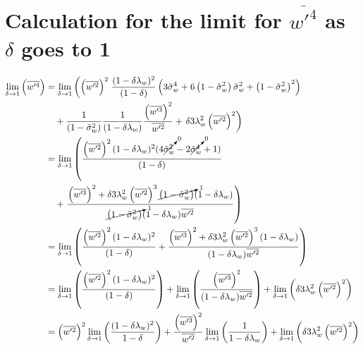 \section{Calculation for the limit for \texorpdfstring{$\overline{w'^4}$}{wprime4bar} as \texorpdfstring{$\delta$}{delta} goes to 1}
\label{sec:calculation-for-the-limit-for-wprime4bar-as-delta-goes-to-1}

{\allowdisplaybreaks
    \begin{align}
        \label{eq:limit_wprime4_delta_to_1_calc}
        \lim_{\delta \to 1}\left(\overline{w'^4}\right)
        &= \lim_{\delta \to 1}
        \left(\left(\overline{w'^2}\right)^2\right.
        \frac{(1-\delta \lambda_w)^2}{(1-\delta)}
        \left(3 \tilde{\sigma}_w^4 + 6 \left( 1 - \tilde{\sigma}_w^2 \right) \tilde{\sigma}_w^2 + \left( 1 - \tilde{\sigma}_w^2 \right)^2\right) \nonumber\\
        &\quad+ \frac{1}{\left( 1 - \tilde{\sigma}_w^2 \right)} \frac{1}{(1-\delta \lambda_w)}
        \frac{\left(\overline{w'^3}\right)^2}{\overline{w'^2}}
        + \left.\delta 3 \lambda_w^2 \left(\overline{w'^2}\right)^2\right) \\
        &= \lim_{\delta \to 1}
        \left(
        \frac{
            \left(\overline{w'^2}\right)^2 (1-\delta \lambda_w)^2
            (4 \cancelto{0}{\tilde{\sigma}_w^2} - 2 \cancelto{0}{\tilde{\sigma}_w^4} + 1)
        }
        {(1-\delta)}
        \right.
        \nonumber\\
        &\quad+ \left.
        \frac{
            \left(\overline{w'^3}\right)^2 +
            \delta 3 \lambda_w^2 \left(\overline{w'^2}\right)^3 \cancelto{1}{\left( 1 - \tilde{\sigma}_w^2 \right)} (1-\delta \lambda_w)
        }
        {
            \cancelto{1}{\left( 1 - \tilde{\sigma}_w^2 \right)} (1-\delta \lambda_w) \overline{w'^2}
        }
        \right)
        \\
        &= \lim_{\delta \to 1}
        \left(
        \frac{\left(\overline{w'^2}\right)^2 (1-\delta \lambda_w)^2}{(1-\delta)} +
        \frac{
            \left(\overline{w'^3}\right)^2 +
            \delta 3 \lambda_w^2 \left(\overline{w'^2}\right)^3
            (1-\delta \lambda_w)
        }{(1-\delta \lambda_w)\overline{w'^2}}
        \right)
        \\
        &= \lim_{\delta \to 1}
        \left(
        \frac{\left(\overline{w'^2}\right)^2 (1-\delta \lambda_w)^2}{(1-\delta)}
        \right) +
        \lim_{\delta \to 1}
        \left(
        \frac{\left(\overline{w'^3}\right)^2}{(1-\delta \lambda_w)\overline{w'^2}}
        \right) +
        \lim_{\delta \to 1}
        \left(
        \delta 3 \lambda_w^2 \left(\overline{w'^2}\right)^2
        \right)
        \\
        &=
        \left(\overline{w'^2}\right)^2 \lim_{\delta \to 1} \left(\frac{ (1-\delta \lambda_w)^2}{1-\delta}\right) +
        \frac{\left(\overline{w'^3}\right)^2}{\overline{w'^2}} \lim_{\delta \to 1}\left(\frac{1}{1-\delta \lambda_w} \right) +
        \lim_{\delta \to 1}
        \left(
        \delta 3 \lambda_w^2 \left(\overline{w'^2}\right)^2
        \right)
    \end{align}
}

